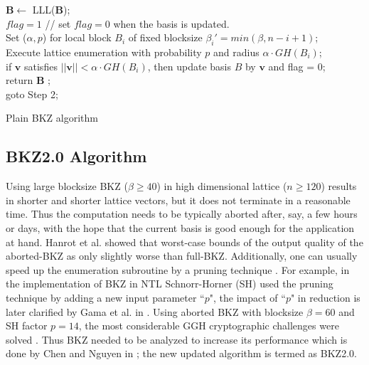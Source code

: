\begin{algorithm}

$\pmb{B} \leftarrow$ LLL($\pmb{B}$);  \\
$flag = 1$ // set $flag = 0$ when the basis is updated. \\

{
    Set ($\alpha, p$) for local block $B_i$ of fixed blocksize $\beta_i' = min(\beta, n-i+1)$; \\
    Execute lattice enumeration with probability $p$ and radius $\alpha \cdot GH(B_i)$; \\
    if $\textbf{v}$ satisfies $||\textbf{v}|| < \alpha \cdot GH(B_i)$, then update basis $B$ by $\textbf{v}$ and flag = 0; \\
}
    {
         return $\pmb{B}$ ;\\
    }
    {
        goto Step 2;
    }
\caption{Plain BKZ algorithm}
\label{alg:Plain_BKZ}
\end{algorithm}












\subsection{BKZ2.0 Algorithm}
Using large blocksize BKZ ($\beta \geq 40$) in high dimensional lattice ($n\geq 120$) results in shorter and shorter lattice vectors, but it does not terminate in a reasonable time.
Thus the computation needs to be typically aborted after, say, a few hours or days, with the hope that the current basis is good enough for the application at hand.
Hanrot et al.
\cite{hanrot2011analyzing} showed that worst-case bounds of the output quality of the aborted-BKZ as only slightly worse than full-BKZ.
Additionally, one can usually speed up the enumeration subroutine by a pruning technique \cite{gama2010lattice,schnorr1994lattice,schnorr1995attacking}.
For example, in the implementation of BKZ in NTL Schnorr-Horner (SH) used the pruning technique \cite{schnorr1995attacking} by adding a new input parameter ``$p$", the impact of ``$p$" in reduction is later clarified by Gama et al.
in \cite{gama2010lattice}.
Using aborted BKZ with blocksize $\beta=60$ and SH factor $p = 14$, the most considerable GGH cryptographic challenges were solved \cite{lee2010cryptanalysis,nguyen1999cryptanalysis}.
Thus BKZ needed to be analyzed to increase its performance which is done by Chen and Nguyen in \cite{chen2011bkz}; the new updated algorithm is termed as BKZ2.0.

